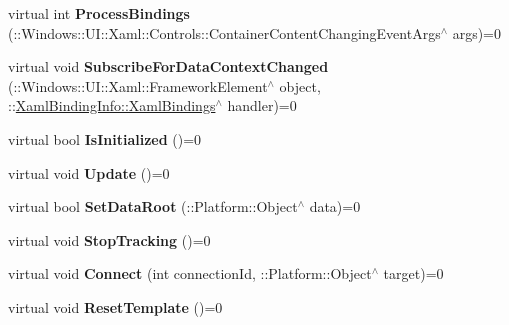 \begin{DoxyCompactItemize}
virtual int {\bfseries Process\+Bindings} (\+::Windows\+::\+U\+I\+::\+Xaml\+::\+Controls\+::\+Container\+Content\+Changing\+Event\+Args$^\wedge$ args)=0
\item 
\mbox{\label{class_xaml_binding_info_1_1_i_xaml_bindings_a9a6e60fee37d0cf53ccebc9d8c07d90f}} 
virtual void {\bfseries Subscribe\+For\+Data\+Context\+Changed} (\+::Windows\+::\+U\+I\+::\+Xaml\+::\+Framework\+Element$^\wedge$ object, \+::\mbox{\hyperlink{class_xaml_binding_info_1_1_xaml_bindings}{Xaml\+Binding\+Info\+::\+Xaml\+Bindings}}$^\wedge$ handler)=0
\item 
\mbox{\label{class_xaml_binding_info_1_1_i_xaml_bindings_a84ac9cebecf96c2c7ccfaeb43e9d4252}} 
virtual bool {\bfseries Is\+Initialized} ()=0
\item 
\mbox{\label{class_xaml_binding_info_1_1_i_xaml_bindings_af7bbb67de71bfaedbf116df6d689f22b}} 
virtual void {\bfseries Update} ()=0
\item 
\mbox{\label{class_xaml_binding_info_1_1_i_xaml_bindings_a35a0a9b1922e3c719c26791bdc0a102e}} 
virtual bool {\bfseries Set\+Data\+Root} (\+::Platform\+::\+Object$^\wedge$ data)=0
\item 
\mbox{\label{class_xaml_binding_info_1_1_i_xaml_bindings_abbffa5e36a4cc1ef3b7e14814112480a}} 
virtual void {\bfseries Stop\+Tracking} ()=0
\item 
\mbox{\label{class_xaml_binding_info_1_1_i_xaml_bindings_a9e14f106ac9c9a8fef1203dc34619865}} 
virtual void {\bfseries Connect} (int connection\+Id, \+::Platform\+::\+Object$^\wedge$ target)=0
\item 
\mbox{\label{class_xaml_binding_info_1_1_i_xaml_bindings_a38efcb61569708b5807d32478b66b6be}} 
virtual void {\bfseries Reset\+Template} ()=0
\item 
\mbox{\label{class_xaml_binding_info_1_1_i_xaml_bindings_a9a6d53b4fae9f58a529b914e60f6a6b1}} 

\end{DoxyCompactItemize}
